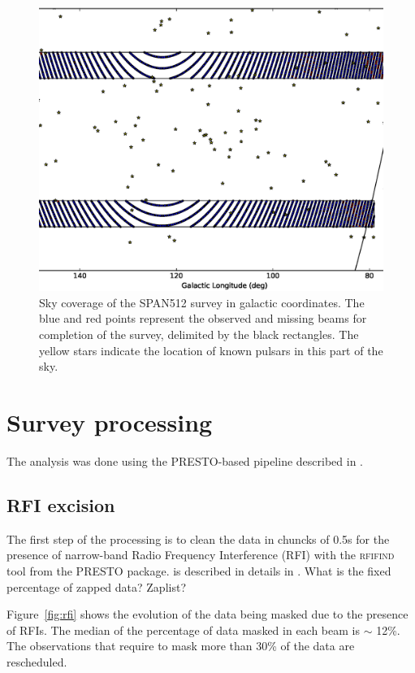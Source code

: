 \documentclass[a4paper,fleqn,usenatbib]{mnras}
\begin{document}
\begin{figure}
\includegraphics[width=\textwidth]{plots/sky.ps}
\caption{Sky coverage of the SPAN512 survey in galactic
  coordinates. The blue and red points represent the observed and
  missing beams for completion of the survey, delimited by the black
  rectangles. The yellow stars indicate the location of known pulsars
  in this part of the sky.}
\label{fig:sky}
\end{figure}




\section{Survey processing}
\label{sec:processing}

The analysis was done using the \textsc{PRESTO}-based pipeline
described in \citet{lbh+15}.

\subsection{RFI excision}

The first step of the processing is to clean the data in chuncks of
0.5s for the presence of narrow-band Radio Frequency Interference
(RFI) with the \textsc{rfifind} tool from the \textsc{PRESTO} package.
is described in details in \citet{lbh+15}.
What is the fixed percentage of zapped data? Zaplist?

Figure~\ref{fig:rfi} shows the evolution of the data being masked due
to the presence of RFIs.  The median of the percentage of data masked
in each beam is $\sim$ 12\%. The observations that require to mask
more than 30\% of the data are rescheduled.
\end{document}
